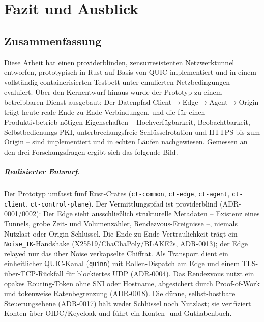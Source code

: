 \chapter{Fazit und Ausblick}
\label{ch:fazit}

\section{Zusammenfassung}
\label{sec:zusammenfassung}

Diese Arbeit hat einen providerblinden, zensurresistenten Netzwerktunnel
entworfen, prototypisch in Rust auf Basis von QUIC implementiert und in einem
vollständig containerisierten Testbett unter emulierten Netzbedingungen
evaluiert. Über den Kernentwurf hinaus wurde der Prototyp zu einem betreibbaren
Dienst ausgebaut: Der Datenpfad
Client$\rightarrow$Edge$\rightarrow$Agent$\rightarrow$Origin trägt heute reale
Ende-zu-Ende-Verbindungen, und die für einen Produktivbetrieb nötigen
Eigenschaften -- Hochverfügbarkeit, Beobachtbarkeit, Selbstbedienungs-PKI,
unterbrechungsfreie Schlüsselrotation und HTTPS bis zum Origin -- sind
implementiert und in echten Läufen nachgewiesen. Gemessen an den drei
Forschungsfragen ergibt sich das folgende Bild.

\paragraph{Realisierter Entwurf.} Der Prototyp umfasst fünf Rust-Crates
(\texttt{ct-common}, \texttt{ct-edge}, \texttt{ct-agent}, \texttt{ct-client},
\texttt{ct-control-plane}). Der Vermittlungspfad ist providerblind
(ADR-0001/0002): Der Edge sieht ausschließlich strukturelle Metadaten --
Existenz eines Tunnels, grobe Zeit- und Volumenzähler, Rendezvous-Ereignisse --,
niemals Nutzlast oder Origin-Schlüssel. Die Ende-zu-Ende-Vertraulichkeit trägt
ein \texttt{Noise\_IK}-Handshake (X25519/ChaChaPoly/BLAKE2s, ADR-0013); der Edge
relayed nur das über Noise verkapselte Chiffrat. Als Transport dient ein
einheitlicher QUIC-Kanal (\texttt{quinn}) mit Rollen-Dispatch am Edge und einem
TLS-über-TCP-Rückfall für blockiertes UDP (ADR-0004). Das Rendezvous nutzt ein
opakes Routing-Token ohne SNI oder Hostname, abgesichert durch Proof-of-Work und
tokenweise Ratenbegrenzung (ADR-0018). Die dünne, selbst-hostbare Steuerungsebene
(ADR-0017) hält weder Schlüssel noch Nutzlast; sie verifiziert Konten über
OIDC/Keycloak und führt ein Konten- und Guthabenbuch.

